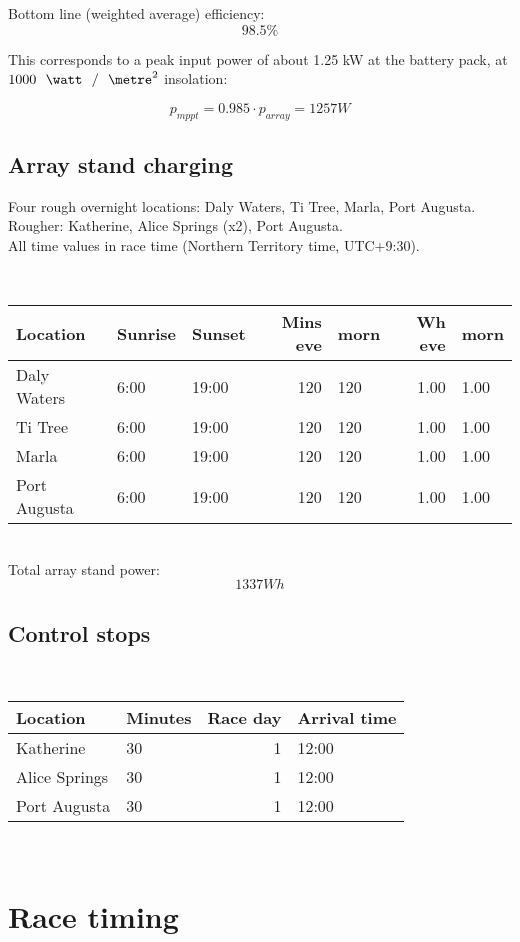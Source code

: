 \documentclass[letterpaper,12pt]{article}
\begin{document}
Bottom line (weighted average) efficiency: $$98.5\%$$

This corresponds to a peak input power of about 1.25 kW at the battery pack, at $1000 \watt\per{\meter^2}$ insolation:

$$p_{mppt} = 0.985 \cdot p_{array} = 1257 W$$

\subsection{Array stand charging}

Four rough overnight locations: Daly Waters, Ti Tree, Marla, Port Augusta. \\

Rougher: Katherine, Alice Springs (x2), Port Augusta. \\

All time values in race time (Northern Territory time, UTC+9:30).

\mbox{}\\
\begin{tabular}{lllrlrl}
Location & Sunrise & Sunset & Mins eve & morn & Wh eve & morn \\
\hline
Daly Waters & 6:00 & 19:00 & 120 & 120 & 1.00 & 1.00 \\ 
Ti Tree & 6:00 & 19:00 & 120 & 120 & 1.00 & 1.00 \\ 
Marla & 6:00 & 19:00 & 120 & 120 & 1.00 & 1.00 \\ 
Port Augusta & 6:00 & 19:00 & 120 & 120 & 1.00 & 1.00 \\ 
\end{tabular}
\mbox{}\\

Total array stand power: $$1337 Wh$$

\subsection{Control stops}
\mbox{}\\
\begin{tabular}{llrl}
Location & Minutes & Race day & Arrival time \\
\hline
Katherine & 30 & 1 & 12:00 \\
Alice Springs & 30 & 1 & 12:00 \\
Port Augusta & 30 & 1 & 12:00 \\
\end{tabular}
\mbox{}\\


\section{Race timing}
\end{document}
